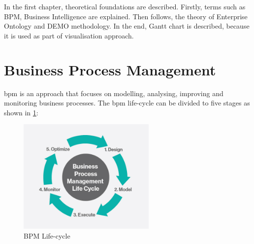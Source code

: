 In the first chapter, theoretical foundations are described. Firstly, terms such as BPM, Business Intelligence are explained. Then follows, the theory of Enterprise Ontology and DEMO methodology. In the end, Gantt chart is described, because it is used as part of visualisation approach. 
\section{Business Process Management}
\gls{bpm} is an approach that focuses on modelling, analysing, improving and monitoring business processes. 
The \gls{bpm} life-cycle can be divided to five stages as shown in \cref{fig:bpm-lifecycle}:

\begin{figure}[ht!]
	\centering
    \includegraphics[width=0.6\textwidth, keepaspectratio]{img/bpm-lifecycle.jpg}
    \caption{BPM Life-cycle \cite{harvey-koeppel-bpm-lifecycle-2015}}
    \label{fig:bpm-lifecycle}
\end{figure}

